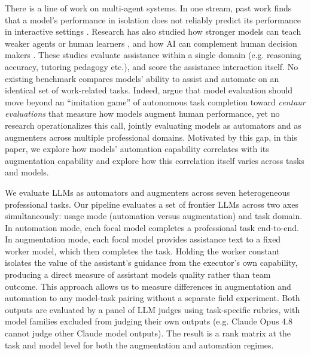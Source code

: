 There is a line of work on multi-agent systems. In one stream, past work finds that a model's performance in isolation does not reliably predict its performance in interactive settings \citep{collins2024, chang2025, vaccaro2024}. Research has also studied how stronger models can teach weaker agents \citep{saha2023} or human learners \citep{macina2025}, and how AI can complement human decision makers \citep{bansal2021}. These studies evaluate assistance within a single domain (e.g. reasoning accuracy, tutoring pedagogy etc.), and score the assistance interaction itself. No existing benchmark compares models’ ability to assist and automate on an identical set of work-related tasks. Indeed, \citet{haupt2025} argue that model evaluation should move beyond an ``imitation game'' of autonomous task completion toward \emph{centaur evaluations} that measure how models augment human performance, yet no research operationalizes this call, jointly evaluating models as automators and as augmenters across multiple professional domains. Motivated by this gap, in this paper, we explore how models' automation capability correlates with its augmentation capability and explore how this correlation itself varies across tasks and models.



We evaluate LLMs as automators and augmenters across seven heterogeneous professional tasks. Our pipeline evaluates a set of frontier LLMs across two axes simultaneously: usage mode (automation versus augmentation) and task domain. In automation mode, each focal model completes a professional task end-to-end. In augmentation mode, each focal model provides assistance text to a fixed worker model, which then completes the task. Holding the worker constant isolates the value of the assistant's guidance from the executor's own capability, producing a direct measure of assistant models quality rather than team outcome. This approach allows us to measure differences in augmentation and automation to any model-task pairing without a separate field experiment. Both outputs are evaluated by a panel of LLM judges using task-specific rubrics, with model families excluded from judging their own outputs (e.g. Claude Opus 4.8 cannot judge other Claude model outputs). The result is a rank matrix at the task and model level for both the augmentation and automation regimes. 

